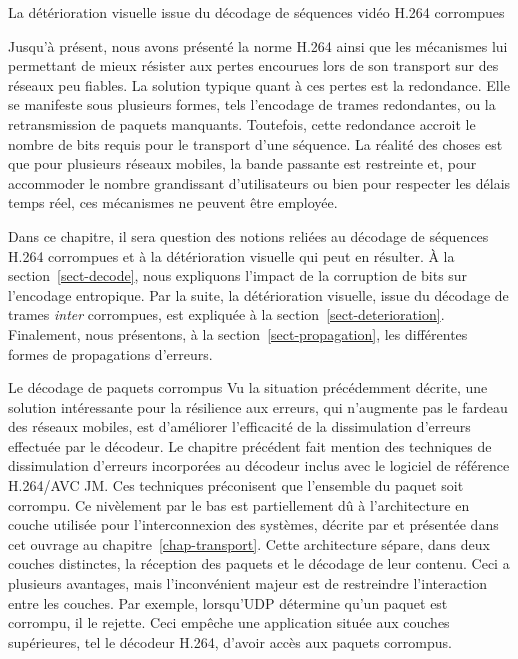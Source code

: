 \documentclass[letterpaper, twoside, 12pt,memoire]{thETS}
\newcommand{\ltCodec}{logiciel de référence H.264/AVC JM}
\newcommand{\sect}[1]{section~\ref{#1}}
\begin{document}
\begin{chapter}{La détérioration visuelle issue du décodage de séquences vidéo
H.264 corrompues}

Jusqu'à présent, nous avons présenté la norme H.264 ainsi que les mécanismes lui
permettant de mieux résister aux pertes encourues lors de son transport sur des
réseaux peu fiables. La solution typique quant à ces pertes est la redondance.
Elle se manifeste sous plusieurs formes, tels l'encodage de trames redondantes,
ou la retransmission de paquets manquants. Toutefois, cette redondance accroit
le nombre de bits requis pour le transport d'une séquence. La réalité des choses
est que pour plusieurs réseaux mobiles, la bande passante est restreinte et,
pour accommoder le nombre grandissant d'utilisateurs ou bien pour respecter les
délais temps réel, ces mécanismes ne peuvent être employée.

Dans ce chapitre, il sera question des notions reliées au décodage de séquences
H.264 corrompues et à la détérioration visuelle qui peut en résulter. À la
\sect{sect-decode}, nous expliquons l'impact de la corruption de bits sur
l'encodage entropique. Par la suite, la détérioration visuelle, issue du
décodage de trames \textit{inter} corrompues, est expliquée à la
\sect{sect-deterioration}. Finalement, nous présentons, à la
\sect{sect-propagation}, les différentes formes de propagations d'erreurs.

\begin{section}{Le décodage de paquets corrompus}
\label{sect-decode}
Vu la situation précédemment décrite, une solution intéressante pour la
résilience aux erreurs, qui n'augmente pas le fardeau des réseaux mobiles, est
d'améliorer l'efficacité de la dissimulation d'erreurs effectuée par le
décodeur. Le chapitre précédent fait mention des techniques de dissimulation
d'erreurs incorporées au décodeur inclus avec le \ltCodec. Ces techniques
préconisent que l'ensemble du paquet soit corrompu. Ce nivèlement par le bas est
partiellement dû à l'architecture en couche utilisée pour l'interconnexion des
systèmes, décrite par \citet{Zimmermann1980} et présentée dans cet ouvrage au
chapitre~\ref{chap-transport}. Cette architecture sépare, dans deux couches
distinctes, la réception des paquets et le décodage de leur contenu. Ceci a
plusieurs avantages, mais l'inconvénient majeur est de restreindre l'interaction
entre les couches. Par exemple, lorsqu'UDP détermine qu'un paquet est corrompu,
il le rejette. Ceci empêche une application située aux couches supérieures, tel
le décodeur H.264, d'avoir accès aux paquets corrompus.


\end{section}
\end{chapter}
\end{document}
